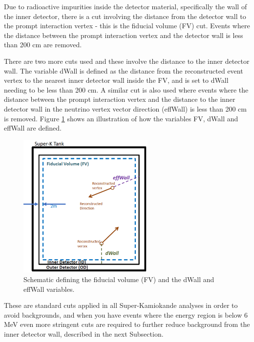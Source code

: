 Due to radioactive impurities inside the detector material, specifically the wall of the inner detector, there is a cut involving the distance from the detector wall to the prompt interaction vertex - this is the fiducial volume (FV) cut. Events where the distance between the prompt interaction vertex and the detector wall is less than 200 cm are removed.

There are two more cuts used and these involve the distance to the inner detector wall. The variable dWall is defined as the distance from the reconstructed event vertex to the nearest inner detector wall inside the FV, and is set to dWall needing to be less than 200 cm.  A similar cut is also used where events where the distance between the prompt interaction vertex and the distance to the inner detector wall in the neutrino vertex vector direction (effWall) is less than 200 cm is removed. Figure \ref{fig:dwall_effwall_fv} shows an illustration of how the variables FV, dWall and effWall are defined. 

\begin{figure}
    \centering 
    \includegraphics[width=0.6\textwidth]{Figures/fv_dwall_effwall.png}
    \caption{Schematic defining the fiducial volume (FV) and the dWall and effWall variables.}
    \label{fig:dwall_effwall_fv}
\end{figure} 
                                                                                        
These are standard cuts applied in all Super-Kamiokande analyses in order to avoid backgrounds, and when you have events where the energy region is below 6 MeV even more stringent cuts are required to further reduce background from the inner detector wall, described in the next Subsection. 

